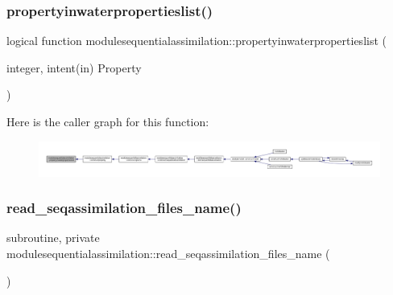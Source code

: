 \subsubsection{\texorpdfstring{propertyinwaterpropertieslist()}{propertyinwaterpropertieslist()}}
{\footnotesize\ttfamily logical function modulesequentialassimilation\+::propertyinwaterpropertieslist (\begin{DoxyParamCaption}\item[{integer, intent(in)}]{Property }\end{DoxyParamCaption})\hspace{0.3cm}{\ttfamily [private]}}

Here is the caller graph for this function\+:\nopagebreak
\begin{figure}[H]
\begin{center}
\leavevmode
\includegraphics[width=350pt]{namespacemodulesequentialassimilation_a8c49e08db24e999a05be06bf048eeb25_icgraph}
\end{center}
\end{figure}
\mbox{\label{namespacemodulesequentialassimilation_ad625646f49c7f79a25eece8ee6fc763c}} 
\subsubsection{\texorpdfstring{read\+\_\+seqassimilation\+\_\+files\+\_\+name()}{read\_seqassimilation\_files\_name()}}
{\footnotesize\ttfamily subroutine, private modulesequentialassimilation\+::read\+\_\+seqassimilation\+\_\+files\+\_\+name (\begin{DoxyParamCaption}{ }\end{DoxyParamCaption})\hspace{0.3cm}{\ttfamily [private]}}

